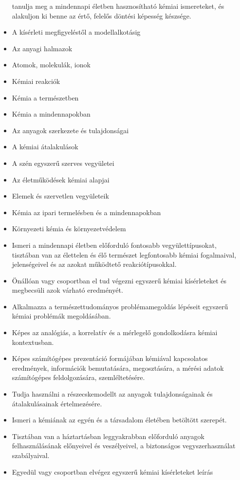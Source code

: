 \begin{itemize}
  tanulja meg a mindennapi életben hasznosítható kémiai ismereteket, és
  alakuljon ki benne az értő, felelős döntési képesség készsége.
\item
  A kísérleti megfigyeléstől a modellalkotásig
\item
  Az anyagi halmazok
\item
  Atomok, molekulák, ionok
\item
  Kémiai reakciók
\item
  Kémia a természetben
\item
  Kémia a mindennapokban
\item
  Az anyagok szerkezete és tulajdonságai
\item
  A kémiai átalakulások
\item
  A szén egyszerű szerves vegyületei
\item
  Az életműködések kémiai alapjai
\item
  Elemek és szervetlen vegyületeik
\item
  Kémia az ipari termelésben és a mindennapokban
\item
  Környezeti kémia és környezetvédelem
\item
  Ismeri a mindennapi életben előforduló fontosabb vegyülettípusokat,
  tisztában van az élettelen és élő természet legfontosabb kémiai
  fogalmaival, jelenségeivel és az azokat működtető reakciótípusokkal.
\item
  Önállóan vagy csoportban el tud végezni egyszerű kémiai kísérleteket
  és megbecsüli azok várható eredményét.
\item
  Alkalmazza a természettudományos problémamegoldás lépéseit egyszerű
  kémiai problémák megoldásában.
\item
  Képes az analógiás, a korrelatív és a mérlegelő gondolkodásra kémiai
  kontextusban.
\item
  Képes számítógépes prezentáció formájában kémiával kapcsolatos
  eredmények, információk bemutatására, megosztására, a mérési adatok
  számítógépes feldolgozására, szemléltetésére.
\item
  Tudja használni a részecskemodellt az anyagok tulajdonságainak és
  átalakulásainak értelmezésére.
\item
  Ismeri a kémiának az egyén és a társadalom életében betöltött
  szerepét.
\item
  Tisztában van a háztartásban leggyakrabban előforduló anyagok
  felhasználásának előnyeivel és veszélyeivel, a biztonságos
  vegyszerhasználat szabályaival.
\item
  Egyedül vagy csoportban elvégez egyszerű kémiai kísérleteket leírás

\end{itemize}
